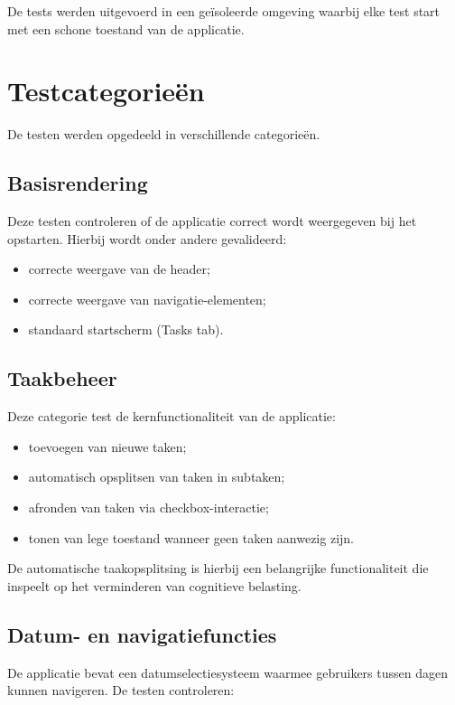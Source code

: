 De tests werden uitgevoerd in een geïsoleerde omgeving waarbij elke test start met een schone toestand van de applicatie.

\section{Testcategorieën}

De testen werden opgedeeld in verschillende categorieën.

\subsection{Basisrendering}

Deze testen controleren of de applicatie correct wordt weergegeven bij het opstarten. Hierbij wordt onder andere gevalideerd:

\begin{itemize}
    \item correcte weergave van de header;
    \item correcte weergave van navigatie-elementen;
    \item standaard startscherm (Tasks tab).
\end{itemize}

\subsection{Taakbeheer}

Deze categorie test de kernfunctionaliteit van de applicatie:

\begin{itemize}
    \item toevoegen van nieuwe taken;
    \item automatisch opsplitsen van taken in subtaken;
    \item afronden van taken via checkbox-interactie;
    \item tonen van lege toestand wanneer geen taken aanwezig zijn.
\end{itemize}

De automatische taakopsplitsing is hierbij een belangrijke functionaliteit die inspeelt op het verminderen van cognitieve belasting.

\subsection{Datum- en navigatiefuncties}

De applicatie bevat een datumselectiesysteem waarmee gebruikers tussen dagen kunnen navigeren. De testen controleren:

